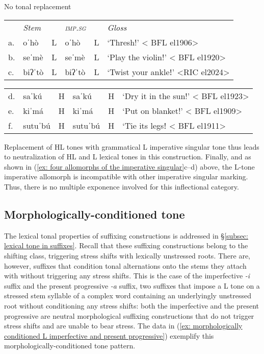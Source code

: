 \ea\label{ex: no tonal replacement in imp sg of L and H toned verbs}
{No tonal replacement }

\begin{tabular}{llllll}
     & \textit{Stem} & &\textit{\textsc{imp.sg}} & & \textit{Gloss} \\
     a. & {oˈhò} &	L &oˈhò&L&	‘Thresh!' < BFL el1906>\\
     b. & {seˈmè} & L & seˈmè & L & ‘Play the violin!’ < BFL el1920>\\
     c. & {biʔˈtò} &	L&	biʔˈtò& L& ‘Twist your ankleǃ’ <RIC el2024>\\
     \end{tabular}

\begin{tabular}{llllll}
     d. & {saˈkú} & H & saˈkú &  H & ‘Dry it in the sun!’ < BFL el1923>\\
     e. & {kiˈmá}	& H & kiˈmá &	H &	`Put on blanket!' < BFL el1909>\\
     f. & {sutuˈbú}	& H & sutuˈbú&H&‘Tie its legsǃ < BFL el1911>\\
\end{tabular}
    \z

Replacement of HL tones with grammatical L imperative singular tone thus leads to neutralization of HL and L lexical tones in this construction. Finally, and as shown in (\ref{ex: four allomorphs of the imperative singular}c--d) above, the L-tone imperative allomorph is incompatible with other imperative singular marking. Thus, there is no multiple exponence involved for this inflectional category.






\subsection{Morphologically-conditioned tone}
\label{subsec: morphologically conditioned tone}

The lexical tonal properties of suffixing constructions is addressed in §\ref{subsec: lexical tone in suffixes}. Recall that these suffixing constructions belong to the shifting class, triggering stress shifts with lexically unstressed roots. There are, however, suffixes that condition tonal alternations onto the stems they attach with without triggering any stress shifts. This is the case of the imperfective \textit{-i} suffix and the present progressive \textit{-a} suffix, two suffixes that impose a L tone on a stressed stem syllable of a complex word containing an underlyingly unstressed root without conditioning any stress shifts: both the imperfective and the present progressive are neutral morphological suffixing constructions that do not trigger stress shifts and are unable to bear stress. The data in (\ref{ex: morphologically conditioned L imperfective and present progressive}) exemplify this morphologically-conditioned tone pattern.

